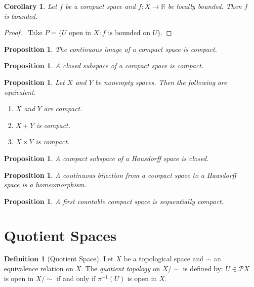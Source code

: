 \documentclass{book}
\let\qed\relax
\newtheorem{prop}[ax]{Proposition}
\newtheorem{cor}{Corollary}[ax]
\theoremstyle{definition}
\newtheorem{df}[ax]{Definition}
\newcommand{\inv}[1]{\ensuremath{{#1}^{-1}}}
\begin{document}
\begin{cor}
Let $f$ be a compact space and $f : X \rightarrow \mathbb{R}$ be locally bounded. Then $f$ is bounded.
\end{cor}

\begin{proof}
\pf\ Take $P = \{ U \text{ open in } X : f \text{ is bounded on } U \}$. \qed
\end{proof}

\begin{prop}
The continuous image of a compact space is compact.
\end{prop}

\begin{prop}
A closed subspace of a compact space is compact.
\end{prop}

\begin{prop}
Let $X$ and $Y$ be nonempty spaces. Then the following are equivalent.
\begin{enumerate}
\item $X$ and $Y$ are compact.
\item $X + Y$ is compact.
\item $X \times Y$ is compact.
\end{enumerate}
\end{prop}

\begin{prop}
A compact subspace of a Hausdorff space is closed.
\end{prop}

\begin{prop}
A continuous bijection from a compact space to a Hausdorff space is a homeomorphism.
\end{prop}

\begin{prop}
A first countable compact space is sequentially compact.
\end{prop}


\section{Quotient Spaces}

\begin{df}[Quotient Space]
Let $X$ be a topological space and $\sim$ an equivalence relation on $X$. The \emph{quotient topology} on $X / \sim$ is defined by: $U \in \mathcal{P} X$ is open in $X / \sim$ if and only if $\inv{\pi}(U)$ is open in $X$.
\end{df}
\end{document}
